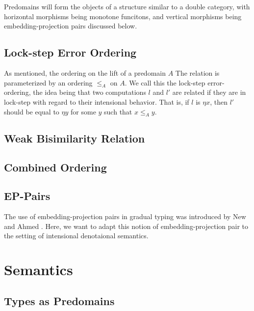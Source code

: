 \documentclass[acmsmall,screen]{acmart}
\begin{document}
Predomains will form the objects of a structure similar to a double category,
with horizontal morphisms being monotone funcitons, and vertical morphisms being
embedding-projection pairs discussed below.



\subsection{Lock-step Error Ordering}\label{subsec:lock-step}

As mentioned, the ordering on the lift of a predomain $A$
The relation is parameterized by an ordering $\le_A$ on $A$.
We call this the lock-step error-ordering, the idea being that two computations
$l$ and $l'$ are related if they are in lock-step with regard to their
intensional behavior. That is, if $l$ is $\eta x$, then $l'$ should be equal to $\eta y$
for some $y$ such that $x \le_A y$.

\subsection{Weak Bisimilarity Relation}



\subsection{Combined Ordering}







\subsection{EP-Pairs}

The use of embedding-projection pairs in gradual typing was introduced by New and
Ahmed \cite{TODO}.
Here, we want to adapt this notion of embedding-projection pair to the setting
of intensional denotaional semantics.





\section{Semantics}\label{sec:semantics}

\subsection{Types as Predomains}
\end{document}
